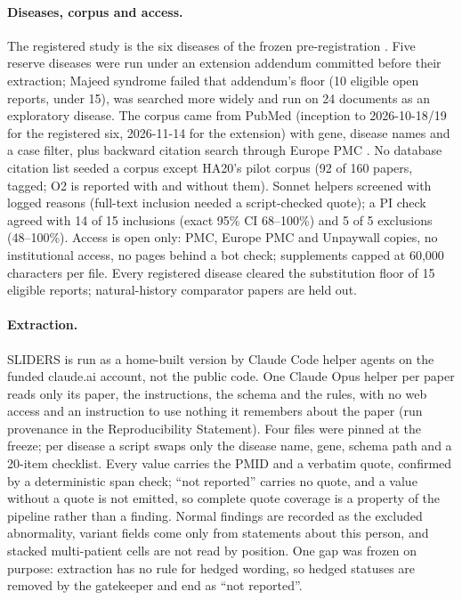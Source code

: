 \documentclass{article} %
\begin{document}
\paragraph{Diseases, corpus and access.} The registered study is the six diseases of the frozen pre-registration \citep{elhani2024_ha20_177,didiasova2020_ssadh_update,koseki2021_tangier_review,almarzanovoa2018_lad1_review,brambatti2019_danon_gender}. Five reserve diseases \citep{wouters2014_blau,vitali2022_lcat,stockleripsiroglu2014_gamt,beyens2018_ats,hajialigol2022_papa} were run under an extension addendum committed before their extraction; Majeed syndrome \citep{ferguson2021_majeed} failed that addendum's floor (10 eligible open reports, under 15), was searched more widely and run on 24 documents as an exploratory disease. The corpus came from PubMed (inception to 2026-10-18/19 for the registered six, 2026-11-14 for the extension) with gene, disease names and a case filter, plus backward citation search through Europe PMC \citep{Rosonovski2023EuropePmc}. No database citation list seeded a corpus except HA20's pilot corpus (92 of 160 papers, tagged; O2 is reported with and without them). Sonnet helpers screened with logged reasons (full-text inclusion needed a script-checked quote); a PI check agreed with 14 of 15 inclusions (exact 95\% CI 68--100\%) and 5 of 5 exclusions (48--100\%). Access is open only: PMC, Europe PMC and Unpaywall copies, no institutional access, no pages behind a bot check; supplements capped at 60,000 characters per file. Every registered disease cleared the substitution floor of 15 eligible reports; natural-history comparator papers are held out.

\paragraph{Extraction.} SLIDERS \citep{joshi2026_sliders} is run as a home-built version by Claude Code helper agents on the funded claude.ai account, not the public code. One Claude Opus helper per paper reads only its paper, the instructions, the schema and the rules, with no web access and an instruction to use nothing it remembers about the paper (run provenance in the Reproducibility Statement). Four files were pinned at the freeze; per disease a script swaps only the disease name, gene, schema path and a 20-item checklist. Every value carries the PMID and a verbatim quote, confirmed by a deterministic span check; ``not reported'' carries no quote, and a value without a quote is not emitted, so complete quote coverage is a property of the pipeline rather than a finding. Normal findings are recorded as the excluded abnormality, variant fields come only from statements about this person, and stacked multi-patient cells are not read by position. One gap was frozen on purpose: extraction has no rule for hedged wording, so hedged statuses are removed by the gatekeeper and end as ``not reported''.
\end{document}
